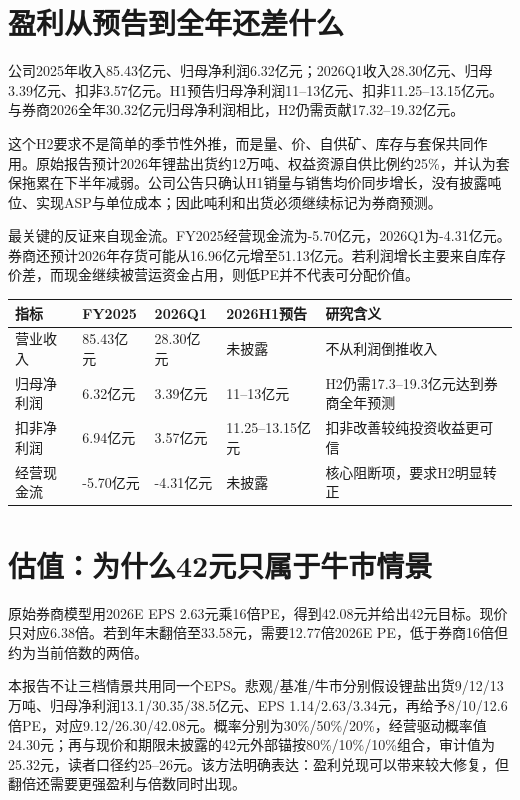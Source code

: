\section{盈利从预告到全年还差什么}

公司2025年收入85.43亿元、归母净利润6.32亿元；2026Q1收入28.30亿元、归母3.39亿元、扣非3.57亿元。H1预告归母净利润11--13亿元、扣非11.25--13.15亿元。与券商2026全年30.32亿元归母净利润相比，H2仍需贡献17.32--19.32亿元。

这个H2要求不是简单的季节性外推，而是量、价、自供矿、库存与套保共同作用。原始报告预计2026年锂盐出货约12万吨、权益资源自供比例约25\%，并认为套保拖累在下半年减弱。公司公告只确认H1销量与销售均价同步增长，没有披露吨位、实现ASP与单位成本；因此吨利和出货必须继续标记为券商预测。

最关键的反证来自现金流。FY2025经营现金流为-5.70亿元，2026Q1为-4.31亿元。券商还预计2026年存货可能从16.96亿元增至51.13亿元。若利润增长主要来自库存价差，而现金继续被营运资金占用，则低PE并不代表可分配价值。

\begin{exhibitbox}
\small
\begin{tabularx}{\exhibitboxwidth}{L{2.5cm} R{2cm} R{2cm} R{2cm} X}
\toprule
指标 & FY2025 & 2026Q1 & 2026H1预告 & 研究含义 \\
\midrule
营业收入 & 85.43亿元 & 28.30亿元 & 未披露 & 不从利润倒推收入 \\
归母净利润 & 6.32亿元 & 3.39亿元 & 11--13亿元 & H2仍需17.3--19.3亿元达到券商全年预测 \\
扣非净利润 & 6.94亿元 & 3.57亿元 & 11.25--13.15亿元 & 扣非改善较纯投资收益更可信 \\
经营现金流 & -5.70亿元 & -4.31亿元 & 未披露 & 核心阻断项，要求H2明显转正 \\
\bottomrule
\end{tabularx}
\end{exhibitbox}

\section{估值：为什么42元只属于牛市情景}

原始券商模型用2026E EPS 2.63元乘16倍PE，得到42.08元并给出42元目标。现价只对应6.38倍。若到年末翻倍至33.58元，需要12.77倍2026E PE，低于券商16倍但约为当前倍数的两倍。

本报告不让三档情景共用同一个EPS。悲观/基准/牛市分别假设锂盐出货9/12/13万吨、归母净利润13.1/30.35/38.5亿元、EPS 1.14/2.63/3.34元，再给予8/10/12.6倍PE，对应9.12/26.30/42.08元。概率分别为30\%/50\%/20\%，经营驱动概率值24.30元；再与现价和期限未披露的42元外部锚按80\%/10\%/10\%组合，审计值为25.32元，读者口径约25--26元。该方法明确表达：盈利兑现可以带来较大修复，但翻倍还需要更强盈利与倍数同时出现。

